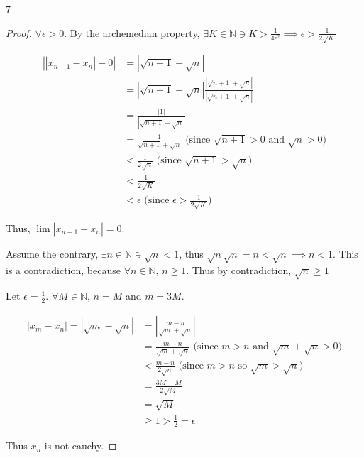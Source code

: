 \documentclass{article}
\newcommand{\N}{\mathbb{N}}
\newcommand{\abs}[1]{\left\lvert#1\right\rvert}
\begin{document}
\bigskip

\begin{PROB}{7}\label{Problem 7.}
\end{PROB}
\begin{proof}
    
    $\forall \epsilon > 0$. By the archemedian property, $\exists K  \in \N \ni K > \frac{1}{4\epsilon^2} \implies \epsilon > \frac{1}{2\sqrt{K}}$  

    \begin{align*}
        \abs{\abs{x_{n + 1} - x_n} - 0} &= \abs{\sqrt{n + 1} - \sqrt{n}} \\
        &= \abs{\sqrt{n + 1} - \sqrt{n}}\frac{\abs{\sqrt{n + 1} + \sqrt{n}}}{\abs{\sqrt{n + 1} + \sqrt{n}}} \\
        &= \frac{\abs{1}}{\abs{\sqrt{n + 1} + \sqrt{n}}} \\
        &= \frac{1}{\sqrt{n + 1} + \sqrt{n}} \text{ (since $\sqrt{n + 1} > 0$ and $\sqrt{n} > 0$)} \\
        &< \frac{1}{2\sqrt{n}} \text{ (since $\sqrt{n + 1} > \sqrt{n}$)} \\
        &< \frac{1}{2\sqrt{K}} \\
        &< \epsilon \text{ (since $\epsilon > \frac{1}{2\sqrt{K}}$)}
    \end{align*}

    Thus, $\lim |x_{n + 1} - x_n| = 0$. 

    Assume the contrary, $\exists n \in \N \ni \sqrt{n} < 1$, thus $\sqrt{n} \sqrt{n} = n < \sqrt{n} \implies n < 1$. This is a contradiction, because $\forall n \in \N$, $n \geq 1$. Thus by contradiction, $\sqrt{n} \geq 1$     

    Let $\epsilon = \frac{1}{2}$. $\forall M \in \N$, $n = M$ and $m = 3M$.
    
    
    
    \begin{align*}
        \abs{x_m - x_n} = \abs{\sqrt{m} - \sqrt{n}} &= \abs{\frac{m - n}{\sqrt{m} + \sqrt{n}}} \\
        &= \frac{m - n}{\sqrt{m} + \sqrt{n}} \text{ (since $m > n$ and $\sqrt{m} + \sqrt{n} > 0$)} \\
        &< \frac{m - n}{2\sqrt{n}} \text{ (since $m > n$ so $\sqrt{m} > \sqrt{n}$)} \\
        &= \frac{3M - M}{2\sqrt{M}} \\
        &= \sqrt{M} \\
        &\geq 1 > \frac{1}{2} = \epsilon
    \end{align*}

    Thus $x_n$ is not cauchy. 
\end{proof}
\end{document}
